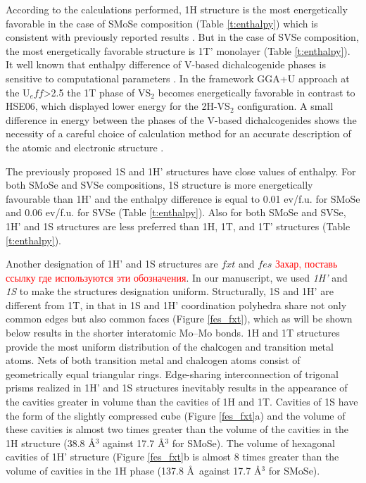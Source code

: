 \documentclass[a4paperm]{article}
\begin{document}
According to the calculations performed, 1H structure is the most energetically favorable in the case of SMoSe composition  (Table \ref{t:enthalpy}) which is consistent with previously reported results \cite{wang20182h}. But in the case of SVSe composition, the most energetically favorable structure is 1T' monolayer (Table \ref{t:enthalpy}). It well known that enthalpy difference of V-based dichalcogenide phases is sensitive to computational parameters \cite{C6CP06732H}. In the framework GGA+U approach at the U$_eff$>2.5 the 1T phase of VS$_2$ becomes energetically favorable \cite{PhysRevB.93.054429} in contrast to HSE06, which displayed lower energy for the 2H-VS$_2$ configuration. A small difference in energy between the phases of the V-based dichalcogenides shows the necessity of a careful choice of calculation method for an accurate description of the atomic and electronic structure \cite{C6CP06732H}.

The previously proposed 1S and 1H' structures \cite{tang2021_janus,ma2016_fxt} have close values of enthalpy.
For both SMoSe and SVSe compositions, 1S structure is more energetically favourable than 1H' and the enthalpy difference is equal to 0.01 ev/f.u. for SMoSe and 0.06 ev/f.u. for SVSe (Table \ref{t:enthalpy}).
Also for both SMoSe and SVSe, 1H' and 1S structures are less preferred than 1H, 1T, and 1T' structures (Table \ref{t:enthalpy}).

Another designation of 1H' and 1S structures are $fxt$ and $fes$ \cite{PhysRevB.93.035442, Terrones_2014,PhysRevB.92.085427}\textcolor{red}{Захар, поставь ссылку где используются эти обозначения}.
In our manuscript, we used {\it 1H'} and {\it 1S} to make the structures designation uniform.
Structurally, 1S and 1H' are different from 1T, in that in 1S and 1H' coordination polyhedra share not only common edges but also common faces (Figure \ref{fes_fxt}), which as will be shown below results in the shorter interatomic Mo--Mo bonds.
1H and 1T structures provide the most uniform distribution of the chalсogen and transition metal atoms.
Nets of both transition metal and chalcogen atoms consist of geometrically equal triangular rings.
Edge-sharing interconnection of trigonal prisms realized in 1H' and 1S structures inevitably results in the appearance of the cavities greater in volume than the cavities of 1H and 1T. 
Cavities of 1S have the form of the slightly compressed cube (Figure \ref{fes_fxt}a) and the volume of these cavities is almost two times greater than the volume of the cavities in the 1H structure (38.8 \AA$^3$ against 17.7 \AA$^3$ for SMoSe).
The volume of hexagonal cavities of 1H' structure (Figure \ref{fes_fxt}b is almost 8 times greater than the volume of cavities in the 1H phase (137.8 \AA\ against 17.7 \AA$^3$ for SMoSe).
\end{document}
